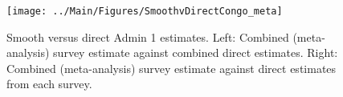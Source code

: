 \documentclass[12pt]{article}\usepackage[]{graphicx}\usepackage[]{color}
\newenvironment{knitrout}{}{} %
\begin{document}



\begin{knitrout}
\color{fgcolor}\begin{figure}[bht]

{\centering \texttt{[image: ../Main/Figures/SmoothvDirectCongo\_meta]} 

}

\caption[Smooth versus direct Admin 1 estimates]{Smooth versus direct Admin 1 estimates. Left: Combined (meta-analysis) survey estimate against combined direct estimates. Right: Combined (meta-analysis) survey estimate against direct estimates from each survey.}\label{fig:unnamed-chunk-73}
\end{figure}


\end{knitrout}
\end{document}
